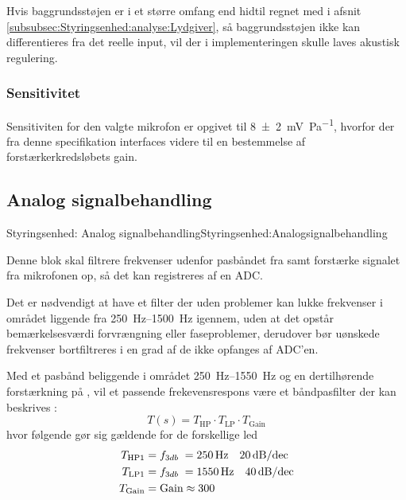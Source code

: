 {Hvis baggrundsstøjen er i et større omfang end hidtil regnet med i afsnit \ref{subsubsec:Styringsenhed:analyse:Lydgiver}, så baggrundsstøjen ikke kan differentieres fra det reelle input, vil der i implementeringen skulle laves akustisk regulering.

\subsubsection{Sensitivitet}
Sensitiviten for den valgte mikrofon er opgivet til \SI{8(2)}{\milli\volt\per\pascal}, hvorfor der fra denne specifikation interfaces videre til en bestemmelse af forstærkerkredsløbets gain.

\subsection{Analog signalbehandling}
\begin{PartBlokDescription}{Styringsenhed: Analog signalbehandling}{Styringsenhed:Analogsignalbehandling}
\end{PartBlokDescription}


Denne blok skal filtrere frekvenser udenfor pasbåndet fra samt forstærke signalet fra mikrofonen op, så det kan registreres af en ADC.

Det er nødvendigt at have et filter der uden problemer kan lukke frekvenser i området liggende fra \SIrange{250}{1500}{Hz} igennem, uden at det opstår bemærkelsesværdi forvrængning eller faseproblemer, derudover bør uønskede frekvenser bortfiltreres i en grad af de ikke opfanges af ADC'en.

Med et pasbånd beliggende i området \SIrange{250}{1550}{Hz} og en dertilhørende forstærkning på , vil et passende frekevensrespons være et båndpasfilter der kan beskrives : 
\begin{equation}
    T(s) = T_{\textrm{HP}} \cdot T_{\textrm{LP}} \cdot T_{\textrm{Gain}} 
\end{equation}
hvor følgende gør sig gældende for de forskellige led
\begin{equation}
    \begin{split}
        T_{\textrm{HP1}} &= \fdb = \SI{250}{Hz} \quad \SI{20}{\dB\per dec} \\
        T_{\textrm{LP1}} &= \fdb = \SI{1550}{Hz} \quad  \SI{40}{\dB\per dec} \\
        T_{\textrm{Gain}} &= \textrm{Gain} \approx  300
    \end{split}
\end{equation}


}
